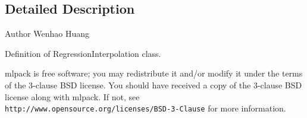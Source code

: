 \subsection{Detailed Description}
\begin{DoxyAuthor}{Author}
Wenhao Huang
\end{DoxyAuthor}
Definition of Regression\+Interpolation class.

mlpack is free software; you may redistribute it and/or modify it under the terms of the 3-\/clause B\+SD license. You should have received a copy of the 3-\/clause B\+SD license along with mlpack. If not, see {\tt http\+://www.\+opensource.\+org/licenses/\+B\+S\+D-\/3-\/\+Clause} for more information. 